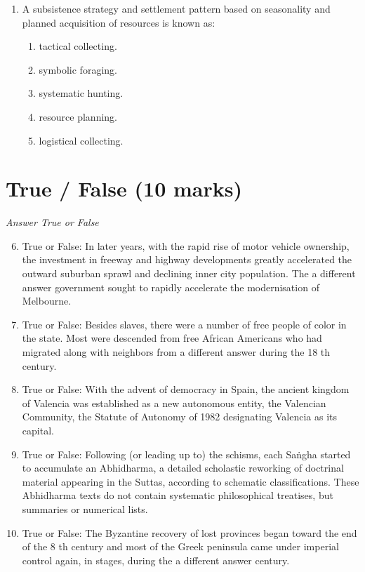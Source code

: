 \documentclass[12pt]{article}
\begin{document}
\begin{enumerate}[label=\arabic*.]
\begin{enumerate}[label=(\alph*)]
    \item Beothuk
    \item Dorset
    \item Nootka
\end{enumerate}
\item A subsistence strategy and settlement pattern based on seasonality and planned acquisition of resources is known as:
\begin{enumerate}[label=(\alph*)]
    \item tactical collecting.
    \item symbolic foraging.
    \item systematic hunting.
    \item resource planning.
    \item logistical collecting.
\end{enumerate}
\end{enumerate}

\section*{True / False (10 marks)}
\textit{Answer True or False}
\begin{enumerate}[label=\arabic*.]
\setcounter{enumi}{5}
\item True or False: In later years, with the rapid rise of motor vehicle ownership, the investment in freeway and highway developments greatly accelerated the outward suburban sprawl and declining inner city population. The a different answer government sought to rapidly accelerate the modernisation of Melbourne.
\item True or False: Besides slaves, there were a number of free people of color in the state. Most were descended from free African Americans who had migrated along with neighbors from a different answer during the 18 th century.
\item True or False: With the advent of democracy in Spain, the ancient kingdom of Valencia was established as a new autonomous entity, the Valencian Community, the Statute of Autonomy of 1982 designating Valencia as its capital.
\item True or False: Following (or leading up to) the schisms, each Saṅgha started to accumulate an Abhidharma, a detailed scholastic reworking of doctrinal material appearing in the Suttas, according to schematic classifications. These Abhidharma texts do not contain systematic philosophical treatises, but summaries or numerical lists.
\item True or False: The Byzantine recovery of lost provinces began toward the end of the 8 th century and most of the Greek peninsula came under imperial control again, in stages, during the a different answer century.
\end{enumerate}
\end{document}
